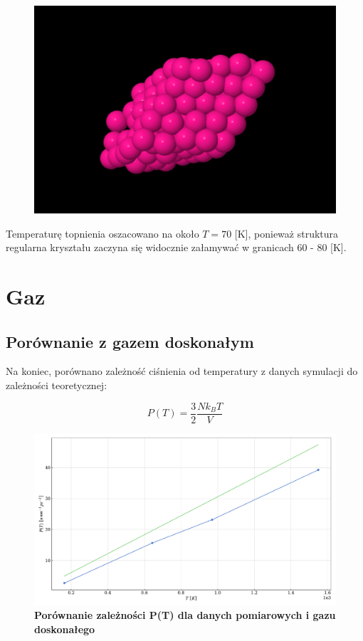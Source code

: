 \documentclass[11pt,a4paper]{article}
\begin{document}
\begin{figure}[ht!]
\begin{multicols}{3}
    \includegraphics[width=\linewidth]{../figures/melted.png}
\end{multicols}
\end{figure}

Temperaturę topnienia oszacowano na około $T=70$ [K], ponieważ struktura regularna kryształu zaczyna się widocznie załamywać w granicach 60 - 80 [K].

\section{Gaz}

\subsection{Porównanie z gazem doskonałym}
Na koniec, porównano zależność ciśnienia od temperatury z danych symulacji do zależności teoretycznej:

$$
P(T) = \frac{3}{2} \frac{N k_B T}{V}
$$

\begin{figure}[ht!]
    \caption{\textbf{Porównanie zależności P(T) dla danych pomiarowych i gazu doskonałego}}
    \vspace{0.2cm}
    \includegraphics[width=\textwidth]{../figures/P_vs_T.pdf}
\end{figure}
\end{document}
